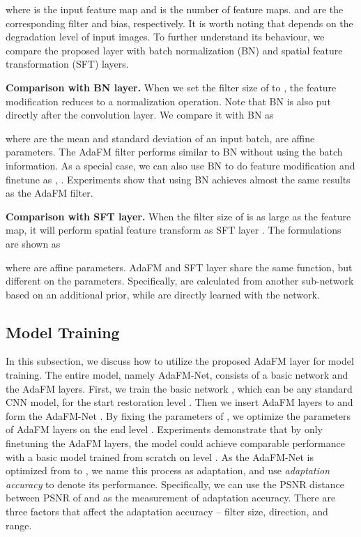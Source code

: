 \documentclass[10pt,twocolumn,letterpaper]{article}
\begin{document}
where  is the input feature map and  is the number of feature maps.  and  are the corresponding filter and bias, respectively. It is worth noting that  depends on the degradation level of input images. To further understand its behaviour, we compare the proposed layer with batch normalization (BN) \cite{Ioffe2015BatchNA} and spatial feature transformation (SFT) \cite{wang2018recovering} layers.


\textbf{Comparison with BN layer.} When we set the filter size of  to , the feature modification reduces to a normalization operation. Note that BN \cite{Ioffe2015BatchNA} is also put directly after the convolution layer. We compare it with BN as
\vspace{-0.5em}

where  are the mean and standard deviation of an input batch,  are affine parameters. The  AdaFM filter performs similar to BN without using the batch information. 
As a special case, we can also use BN to do feature modification and finetune  as , . Experiments show that using BN achieves almost the same results as the  AdaFM filter.

\textbf{Comparison with SFT layer.} When the filter size of  is as large as the feature map, it will perform spatial feature transform as SFT layer \cite{wang2018recovering}. The formulations are shown as 
\vspace{-0.5em}

where  are affine parameters. AdaFM and SFT layer share the same function, but different on the parameters. Specifically,  are calculated from another sub-network based on an additional prior, while  are directly learned with the network. 


\subsection{Model Training}
\label{sec:train}
In this subsection, we discuss how to utilize the proposed AdaFM layer for model training. The entire model, namely AdaFM-Net, consists of a basic network and the AdaFM layers. First, we train the basic network , which can be any standard CNN model, for the start restoration level . Then we insert AdaFM layers to  and form the AdaFM-Net . By fixing the parameters of , we optimize the parameters of AdaFM layers on the end level . Experiments demonstrate that by only finetuning the AdaFM layers, the model  could achieve comparable performance with a basic model  trained from scratch on level . As the AdaFM-Net is optimized from  to , we name this process as adaptation, and use \textit{adaptation accuracy} to denote its performance. Specifically, we can use the PSNR distance between PSNR of  and  as the measurement of adaptation accuracy.
There are three factors that affect the adaptation accuracy -- filter size, direction, and range.
\end{document}
